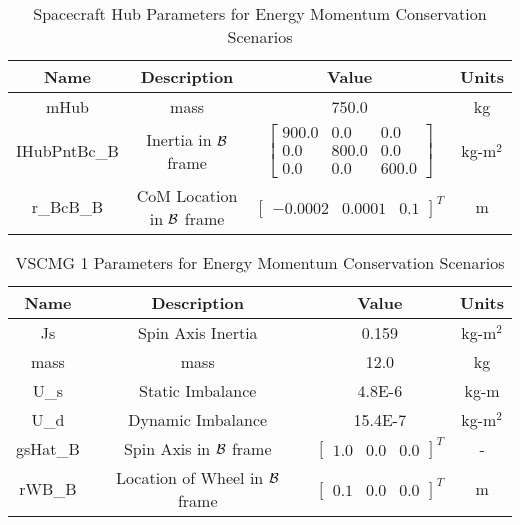 \begin{table}[htbp]
	\caption{Spacecraft Hub Parameters for Energy Momentum Conservation Scenarios}
	\label{tab:hub}
	\centering \fontsize{10}{10}\selectfont
	\begin{tabular}{ c | c | c | c } %
		\hline
		\textbf{Name}  & \textbf{Description}  & \textbf{Value} & \textbf{Units} \\
		\hline
		mHub  & mass & 750.0 & kg \\
		IHubPntBc\_B & Inertia in $\cal{B}$ frame & $\begin{bmatrix}
		900.0 & 0.0 & 0.0\\
		0.0 & 800.0 & 0.0\\
		0.0 & 0.0 & 600.0
		\end{bmatrix}$ & kg-m$^2$ \\
		r\_BcB\_B & CoM Location in $\cal{B}$ frame & $\begin{bmatrix}
		-0.0002 & 0.0001 & 0.1 \end{bmatrix}^T$ & m \\
		\hline
	\end{tabular}
\end{table}

\begin{table}[htbp]
	\caption{VSCMG 1 Parameters for Energy Momentum Conservation Scenarios}
	\label{tab:rw1}
	\centering \fontsize{10}{10}\selectfont
	\begin{tabular}{ c | c | c | c } %
		\hline
		\textbf{Name}  & \textbf{Description}  & \textbf{Value} & \textbf{Units} \\
		\hline
		Js  & Spin Axis Inertia & 0.159 & kg-m$^2$ \\
		mass & mass & 12.0 & kg \\
		U\_s & Static Imbalance & 4.8E-6 & kg-m \\
		U\_d & Dynamic Imbalance & 15.4E-7 & kg-m$^2$ \\
		gsHat\_B & Spin Axis in $\cal{B}$ frame & $\begin{bmatrix}
		1.0 & 0.0 & 0.0 \end{bmatrix}^T$ & - \\
		rWB\_B & Location of Wheel in $\cal{B}$ frame & $\begin{bmatrix}
		0.1 & 0.0 & 0.0 \end{bmatrix}^T$ & m \\
		\hline
	\end{tabular}
\end{table}

